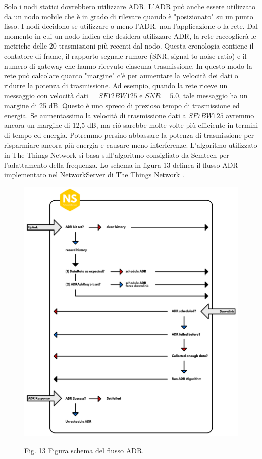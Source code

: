 \documentclass[a4paper]{report} %
\begin{document}
Solo i nodi statici dovrebbero utilizzare ADR. L'ADR può anche essere utilizzato da un nodo mobile che è in grado di rilevare quando è "posizionato" su un punto fisso. I nodi decidono se utilizzare o meno l'ADR, non l'applicazione o la rete. Dal momento in cui un nodo indica che desidera utilizzare ADR, la rete raccoglierà le metriche delle 20 trasmissioni più recenti dal nodo. Questa cronologia contiene il contatore di frame, il rapporto segnale-rumore (SNR, signal-to-noise ratio) e il numero di gateway che hanno ricevuto ciascuna trasmissione. In questo modo la rete può calcolare quanto "margine" c'è per aumentare la velocità dei dati o ridurre la potenza di trasmissione. Ad esempio, quando la rete riceve un messaggio con velocità dati = $SF12BW125$ e $SNR = 5.0$, tale messaggio ha un margine di 25 dB. Questo è uno spreco di prezioso tempo di trasmissione ed energia. Se aumentassimo la velocità di trasmissione dati a $SF7BW125$ avremmo ancora un margine di 12,5 dB, ma ciò sarebbe molte volte più efficiente in termini di tempo ed energia. Potremmo persino abbassare la potenza di trasmissione per risparmiare ancora più energia e causare meno interferenze. L'algoritmo utilizzato in The Things Network si basa sull'algoritmo consigliato da Semtech per l'adattamento della frequenza. Lo schema in figura 13 delinea il flusso ADR implementato nel NetworkServer di The Things Network \cite{art:rif.32}.

\begin{figure}
\centering
\includegraphics[scale=.5]{Immagini/adr.png}

Fig. 13 Figura schema del flusso ADR.
\end{figure}
\end{document}
